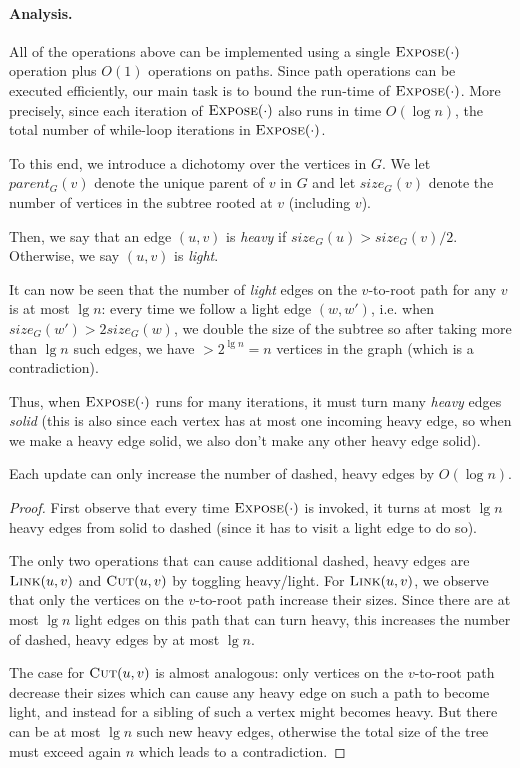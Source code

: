\paragraph{Analysis.} All of the operations above can be implemented using a single $\textsc{Expose}(\cdot)$ operation plus $O(1)$ operations on paths. Since path operations can be executed efficiently, our main task is to bound the run-time of $\textsc{Expose}(\cdot)$. More precisely, since each iteration of $\textsc{Expose}(\cdot)$ also runs in time $O(\log n)$, the total number of while-loop iterations in $\textsc{Expose}(\cdot)$.

To this end, we introduce a dichotomy over the vertices in $G$. We let $parent_G(v)$ denote the unique parent of $v$ in $G$ and let $size_G(v)$ denote the number of vertices in the subtree rooted at $v$ (including $v$). 

\begin{definition}
Then, we say that an edge $(u,v)$ is \emph{heavy} if $size_G(u) > size_G(v)/2$. Otherwise, we say $(u,v)$ is \emph{light}. 
\end{definition}

It can now be seen that the number of \emph{light} edges on the $v$-to-root path for any $v$ is at most $\lg n$: every time we follow a light edge $(w,w')$, i.e. when $size_G(w') > 2 size_G(w)$, we double the size of the subtree so after taking more than $\lg n$ such edges, we have $> 2^{\lg n} = n$ vertices in the graph (which is a contradiction).

Thus, when $\textsc{Expose}(\cdot)$ runs for many iterations, it must turn many \emph{heavy} edges \emph{solid} (this is also since each vertex has at most one incoming heavy edge, so when we make a heavy edge solid, we also don't make any other heavy edge solid). 

\begin{claim}
Each update can only increase the number of dashed, heavy edges by $O(\log n)$. 
\end{claim}
\begin{proof}
First observe that every time $\textsc{Expose}(\cdot)$ is invoked, it turns at most $\lg n$ heavy edges from solid to dashed (since it has to visit a light edge to do so).

The only two operations that can cause additional dashed, heavy edges are $\textsc{Link}(u,v)$ and $\textsc{Cut}(u,v)$ by toggling heavy/light. For $\textsc{Link}(u,v)$, we observe that only the vertices on the $v$-to-root path increase their sizes. Since there are at most $\lg n$ light edges on this path that can turn heavy, this increases the number of dashed, heavy edges by at most $\lg n$. 

The case for $\textsc{Cut}(u,v)$ is almost analogous: only vertices on the $v$-to-root path decrease their sizes which can cause any heavy edge on such a path to become light, and instead for a sibling of such a vertex might becomes heavy. But there can be at most $\lg n$ such new heavy edges, otherwise the total size of the tree must exceed again $n$ which leads to a contradiction.
\end{proof}

